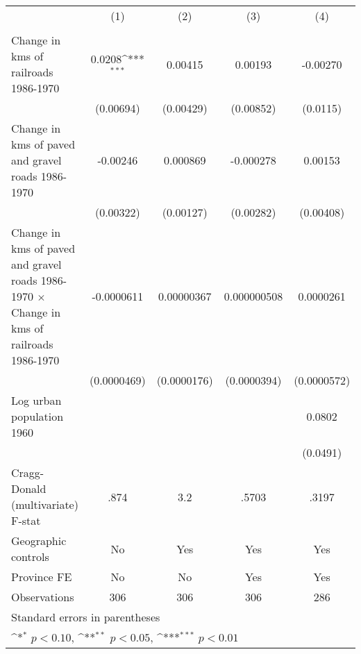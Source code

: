 {
\def\sym#1{\ifmmode^{#1}\else\(^{#1}\)\fi}
\begin{tabular}{l*{4}{c}}
\hline\hline
                &\multicolumn{1}{c}{(1)}&\multicolumn{1}{c}{(2)}&\multicolumn{1}{c}{(3)}&\multicolumn{1}{c}{(4)}\\
                &\multicolumn{1}{c}{}&\multicolumn{1}{c}{}&\multicolumn{1}{c}{}&\multicolumn{1}{c}{}\\
\hline
Change in kms of railroads 1986-1970&   0.0208\sym{***}&  0.00415         &  0.00193         & -0.00270         \\
                &(0.00694)         &(0.00429)         &(0.00852)         & (0.0115)         \\
[1em]
Change in kms of paved and gravel roads 1986-1970& -0.00246         & 0.000869         &-0.000278         &  0.00153         \\
                &(0.00322)         &(0.00127)         &(0.00282)         &(0.00408)         \\
[1em]
Change in kms of paved and gravel roads 1986-1970 $\times$ Change in kms of railroads 1986-1970&-0.0000611         &0.00000367         &0.000000508         &0.0000261         \\
                &(0.0000469)         &(0.0000176)         &(0.0000394)         &(0.0000572)         \\
[1em]
Log urban population 1960&                  &                  &                  &   0.0802         \\
                &                  &                  &                  & (0.0491)         \\
\hline
Cragg-Donald (multivariate) F-stat&     .874         &      3.2         &    .5703         &    .3197         \\
Geographic controls&       No         &      Yes         &      Yes         &      Yes         \\
Province FE     &       No         &       No         &      Yes         &      Yes         \\
Observations    &      306         &      306         &      306         &      286         \\
\hline\hline
\multicolumn{5}{l}{\footnotesize Standard errors in parentheses}\\
\multicolumn{5}{l}{\footnotesize \sym{*} \(p<0.10\), \sym{**} \(p<0.05\), \sym{***} \(p<0.01\)}\\
\end{tabular}
}
